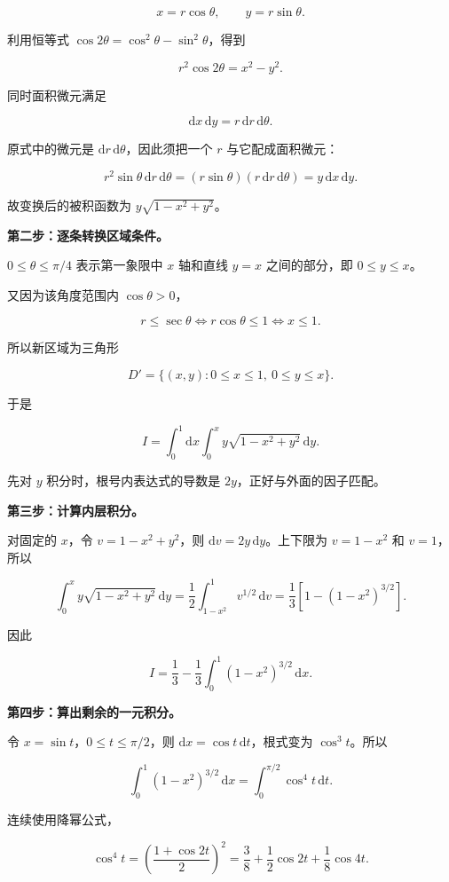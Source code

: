 \documentclass[UTF8,11pt,fontset=windows]{ctexart}
\begin{document}
$$
x=r\cos\theta,\qquad y=r\sin\theta.
$$

利用恒等式 $\cos2\theta=\cos^2\theta-\sin^2\theta$，得到

$$
r^2\cos2\theta=x^2-y^2.
$$

同时面积微元满足

$$
\mathrm dx\,\mathrm dy=r\,\mathrm dr\,\mathrm d\theta.
$$

原式中的微元是 $\mathrm dr\,\mathrm d\theta$，因此须把一个 $r$ 与它配成面积微元：

$$
r^2\sin\theta\,\mathrm dr\,\mathrm d\theta
=(r\sin\theta)(r\,\mathrm dr\,\mathrm d\theta)
=y\,\mathrm dx\,\mathrm dy.
$$

故变换后的被积函数为 $y\sqrt{1-x^2+y^2}$。

\textbf{第二步：逐条转换区域条件。}

$0\le\theta\le\pi/4$ 表示第一象限中 $x$ 轴和直线 $y=x$ 之间的部分，即 $0\le y\le x$。

又因为该角度范围内 $\cos\theta>0$，

$$
r\le\sec\theta
\Longleftrightarrow r\cos\theta\le1
\Longleftrightarrow x\le1.
$$

所以新区域为三角形

$$
D'=\{(x,y):0\le x\le1,\ 0\le y\le x\}.
$$

于是

$$
I=\int_0^1\mathrm dx\int_0^x y\sqrt{1-x^2+y^2}\,\mathrm dy.
$$

先对 $y$ 积分时，根号内表达式的导数是 $2y$，正好与外面的因子匹配。

\textbf{第三步：计算内层积分。}

对固定的 $x$，令 $v=1-x^2+y^2$，则 $\mathrm dv=2y\,\mathrm dy$。上下限为 $v=1-x^2$ 和 $v=1$，所以

$$
\int_0^x y\sqrt{1-x^2+y^2}\,\mathrm dy
=\frac12\int_{1-x^2}^1v^{1/2}\,\mathrm dv
=\frac13\left[1-(1-x^2)^{3/2}\right].
$$

因此

$$
I=\frac13-\frac13\int_0^1(1-x^2)^{3/2}\,\mathrm dx.
$$

\textbf{第四步：算出剩余的一元积分。}

令 $x=\sin t$，$0\le t\le\pi/2$，则 $\mathrm dx=\cos t\,\mathrm dt$，根式变为 $\cos^3t$。所以

$$
\int_0^1(1-x^2)^{3/2}\,\mathrm dx
=\int_0^{\pi/2}\cos^4t\,\mathrm dt.
$$

连续使用降幂公式，

$$
\cos^4t=\left(\frac{1+\cos2t}{2}\right)^2
=\frac38+\frac12\cos2t+\frac18\cos4t.
$$
\end{document}
